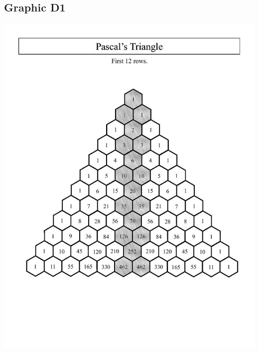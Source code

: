 \documentclass[titlepage, 11pt]{article}
\begin{document}
\subsection{Graphic D1}
\begin{center}
\includegraphics[scale = 0.4]{images/pascals-triangle-vert.jpg} \\
\end{center}
\end{document}
